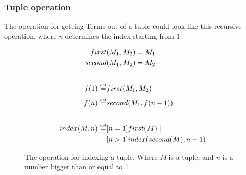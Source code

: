 \subsubsection{Tuple operation}
The operation for getting Terms out of a tuple could look like this recursive operation, where \textit{n} determines the index starting from 1.  
\begin{figure}[h]
    \begin{center}
        \begin{align*}
            first&(M_1, M_2) = M_1\\
            second&(M_1, M_2) = M_2\\
            \\
            f(1) \overset{\underset{\mathrm{def}}{}}{=} & first(M_1, M_2)\\
            f(n) \overset{\underset{\mathrm{def}}{}}{=} & second(M_1, f(n-1))\\
            \\
            index(M, n) \overset{\underset{\mathrm{def}}{}}{=} &[n = 1]first(M)\mid \\
            &[n > 1]index(second(M), n-1)
        \end{align*}
    \end{center}
    \caption{The operation for indexing a tuple. Where \textit{M} is a tuple, and \textit{n} is a number bigger than  or equal to 1}
\end{figure}
\FloatBarrier
